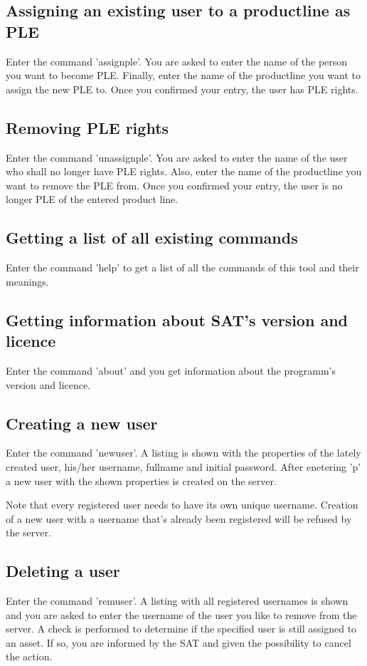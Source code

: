 \subsection{Assigning an existing user to a productline as PLE}
Enter the command 'assignple'. You are asked to enter the name of the person you want
to become PLE. Finally, enter the name of the productline you want to assign the new 
PLE to. Once you confirmed your entry, the user has PLE rights.

\subsection{Removing PLE rights}
Enter the command 'unassignple'. You are asked to enter the name of the user who shall 
no longer have PLE rights. Also, enter the name of the productline you want to
remove the PLE from. Once you confirmed your entry, the user is no longer PLE of
the entered product line.

\subsection{Getting a list of all existing commands}
Enter the command 'help' to get a list of all the commands of this tool and
their meanings.

\subsection{Getting information about SAT's version and licence}
Enter the command 'about' and you get information about the programm's version and licence.

\subsection{Creating a new user}
Enter the command 'newuser'. A listing is shown with the properties of the lately created
user, his/her username, fullname and initial password. After enetering 'p' a new user with
the shown properties is created on the server.\par

Note that every registered user needs to have its own unique username. Creation of a new user 
with a username that's already been registered will be refused by the server.

\subsection{Deleting a user}
Enter the command 'remuser'. A listing with all registered usernames is shown and you are
asked to enter the username of the user you like to remove from the server. A check is
performed to determine if the specified user is still assigned to an asset. If so, you are
informed by the SAT and given the possibility to cancel the action.

